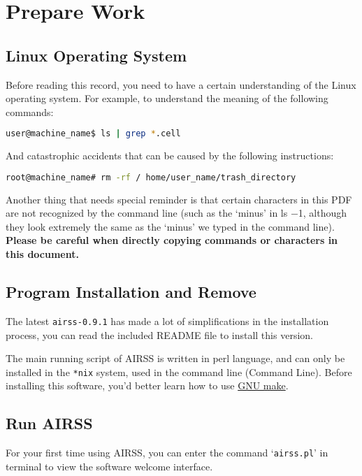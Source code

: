 \documentclass[a4paper, 10pt]{article}
\begin{document}
\newpage
\section{Prepare Work}
\subsection{Linux Operating System} 
Before reading this record, you need to have a certain understanding of the Linux operating system. For example, to understand the meaning of the following commands:
\begin{lstlisting}[language={bash}]
user@machine_name$ ls | grep *.cell
\end{lstlisting}

And catastrophic accidents that can be caused by the following instructions:
\begin{lstlisting}[language={bash}]
root@machine_name# rm -rf / home/user_name/trash_directory
\end{lstlisting}

Another thing that needs special reminder is that certain characters in this PDF are not recognized by the command line (such as the `minus' in ls  \(-\)1, although they look extremely the same as the `minus' we typed in the command line). \textbf{Please be careful when directly copying commands or characters in this document.}

\subsection{Program Installation and Remove}

The latest \verb|airss-0.9.1| has made a lot of simplifications in the installation process, you can read the included README file to install this version.

The main running script of AIRSS is written in perl language, and can only be installed in the \verb|*nix| system, used in the command line (Command Line). Before installing this software, you'd better learn how to use \href{https://www.gnu.org/software/make/manual/}{GNU make}.

\subsection{Run AIRSS}
For your first time using AIRSS, you can enter the command `\verb|airss.pl|' in terminal to view the software welcome interface.
\end{document}
